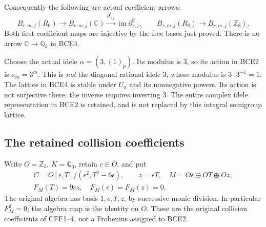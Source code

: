 Consequently the following are actual coefficient arrows:
\begin{equation}\tag{BCE4}
B_{r,m,j}(R_0)\longrightarrow B_{r,m,j}(\mathbb C)
\xrightarrow{\partial^\theta_{r,j}}\operatorname{im}\partial^\theta_{r,j},
\qquad
B_{r,m,j}(R_0)\longrightarrow B_{r,m,j}(\mathbb Z_3).
\end{equation}
Both first coefficient maps are injective by the free bases just
proved. There is no arrow \(\mathbb C\to\mathbb Q_3\) in BCE4.

Choose the actual idele
\(\alpha=(3,(1)_p)\). Its modulus is \(3\), so its action in BCE2
is \(a_m=3^m\). This is \emph{not} the diagonal rational idele \(3\),
whose modulus is \(3\cdot3^{-1}=1\). The lattice in BCE4 is stable
under \(U_\alpha\) and its nonnegative powers. Its action is not
surjective there; the inverse requires inverting 3. The entire
complex idele representation in BCE2 is retained, and is not
replaced by this integral semigroup lattice.

\subsection{The retained collision coefficients}

Write \(O=\mathbb Z_3\), \(K=\mathbb Q_3\), retain \(c\in O\), and put
\begin{equation}\tag{BCE5}
\begin{gathered}
C=O[\epsilon,T]/(\epsilon^2,T^2-6\epsilon),\qquad
z=\epsilon T,\quad M=O\epsilon\oplus OT\oplus Oz,\\
F_M(T)=9cz,\quad F_M(\epsilon)=F_M(z)=0 .
\end{gathered}
\end{equation}
The original algebra has basis \(1,\epsilon,T,z\), by successive
monic division. In particular \(F_M^2=0\); the algebra map is the
identity on \(O\). These are the original collision coefficients of
CFF1--4, not a Frobenius assigned to BCE2.

